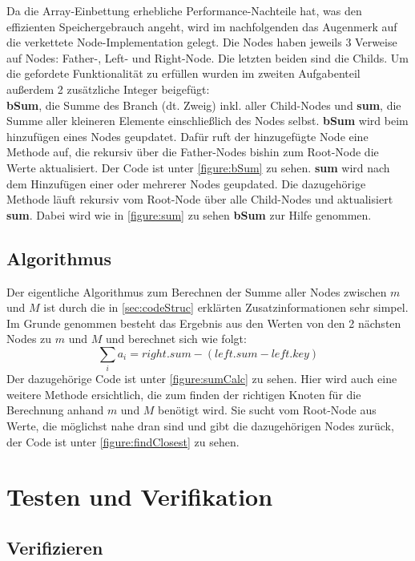 \documentclass[11pt]{scrartcl}
\begin{document}
		Da die Array-Einbettung erhebliche Performance-Nachteile hat, was den effizienten Speichergebrauch angeht, wird im nachfolgenden das Augenmerk auf die verkettete Node-Implementation gelegt.
		Die Nodes haben jeweils 3 Verweise auf Nodes: Father-, Left- und Right-Node. Die letzten beiden sind die Childs. 
		Um die gefordete Funktionalität zu erfüllen wurden im zweiten Aufgabenteil außerdem 2 zusätzliche Integer beigefügt: \\
		\textbf{bSum}, die Summe des Branch (dt. Zweig) inkl. aller Child-Nodes und \textbf{sum}, die Summe aller kleineren Elemente einschließlich des Nodes selbst.
		\textbf{bSum} wird beim hinzufügen eines Nodes geupdatet. Dafür ruft der hinzugefügte Node eine Methode auf, die rekursiv über die Father-Nodes bishin zum Root-Node die Werte aktualisiert. Der Code ist unter \ref{figure:bSum} zu sehen.
		\textbf{sum} wird nach dem Hinzufügen einer oder mehrerer Nodes geupdated. Die dazugehörige Methode läuft rekursiv vom Root-Node über alle Child-Nodes und aktualisiert \textbf{sum}. Dabei wird wie in \ref{figure:sum} zu sehen \textbf{bSum} zur Hilfe genommen.

	\subsection{Algorithmus}
		\label{sec:algo}

		Der eigentliche Algorithmus zum Berechnen der Summe aller Nodes zwischen $m$ und $M$ ist durch die in \ref{sec:codeStruc} erklärten Zusatzinformationen sehr simpel.
		Im Grunde genommen besteht das Ergebnis aus den Werten von den 2 nächsten Nodes zu $m$ und $M$ und berechnet sich wie folgt:
		\begin{equation*}
		\sum_{i}a_i = right.sum - (left.sum - left.key)
		\end{equation*}
		Der dazugehörige Code ist unter \ref{figure:sumCalc} zu sehen. Hier wird auch eine weitere Methode ersichtlich, die zum finden der richtigen Knoten für die Berechnung anhand $m$ und $M$ benötigt wird.
		Sie sucht vom Root-Node aus Werte, die möglichst nahe dran sind und gibt die dazugehörigen Nodes zurück, der Code ist unter \ref{figure:findClosest} zu sehen.

		
\section{Testen und Verifikation}
\label{sec:vertests}

	\subsection{Verifizieren}
		\label{sec:veri}
		
\end{document}
